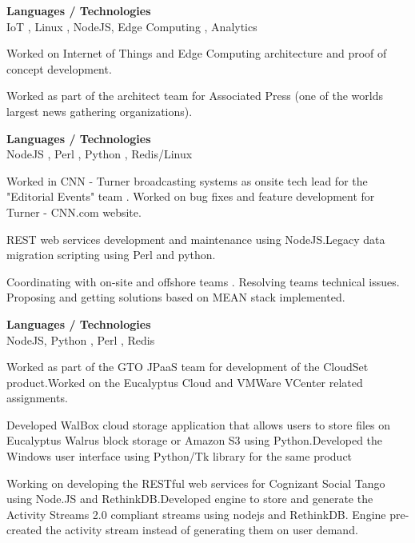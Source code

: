 \documentclass[a4,10pt]{cv4tw}
\begin{document}
{\textbf{Languages / Technologies} \\ IoT , Linux , NodeJS, Edge Computing , Analytics }
	{
	\begin{missions}
		\item Worked on Internet of Things and Edge Computing architecture and proof of concept development.
		\item Worked as part of the architect team for Associated Press (one of the worlds largest news gathering organizations).
	\end{missions}
}

{\textbf{Languages / Technologies} \\ NodeJS , Perl , Python , Redis/Linux}
	{
	\begin{missions}
		\item Worked in CNN - Turner broadcasting systems as onsite tech lead for the "Editorial Events" team . Worked on bug fixes and feature development for Turner - CNN.com website.
		\item REST web services development and maintenance using NodeJS.Legacy data migration scripting using Perl and python.
		\item Coordinating with on-site and offshore teams . Resolving teams technical issues. Proposing and getting solutions based on MEAN stack implemented.
	\end{missions}
}

{\textbf{Languages / Technologies} \\ NodeJS, Python , Perl , Redis}
	{
	\begin{missions}
		\item Worked as part of the GTO JPaaS team for development of the CloudSet product.Worked on the Eucalyptus Cloud and VMWare VCenter related assignments.
		\item Developed WalBox cloud storage application that allows users to store files on Eucalyptus Walrus block storage or Amazon S3 using Python.Developed the Windows user interface using Python/Tk library for the same product
		\item Working on  developing the RESTful web services for Cognizant Social Tango using Node.JS and RethinkDB.Developed engine to store and generate the Activity Streams 2.0 compliant streams using nodejs and RethinkDB. Engine pre-created the activity stream instead of generating them on user demand.
	\end{missions}
}
\end{document}
